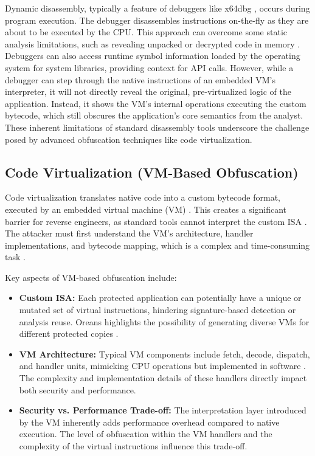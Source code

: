 Dynamic disassembly, typically a feature of debuggers like x64dbg \cite{Dun14}, occurs during program execution. The debugger disassembles instructions on-the-fly as they are about to be executed by the CPU. This approach can overcome some static analysis limitations, such as revealing unpacked or decrypted code in memory \cite{Sikorski2012}. Debuggers can also access runtime symbol information loaded by the operating system for system libraries, providing context for API calls. However, while a debugger can step through the native instructions of an embedded VM's interpreter, it will not directly reveal the original, pre-virtualized logic of the application. Instead, it shows the VM's internal operations executing the custom bytecode, which still obscures the application's core semantics from the analyst. These inherent limitations of standard disassembly tools underscore the challenge posed by advanced obfuscation techniques like code virtualization.

\subsection{Code Virtualization (VM-Based Obfuscation)}
Code virtualization translates native code into a custom bytecode format, executed by an embedded virtual machine (VM) \cite{Ore06, Zho24}. This creates a significant barrier for reverse engineers, as standard tools cannot interpret the custom ISA \cite{Salwan2018SymbolicDeobfuscation}. The attacker must first understand the VM's architecture, handler implementations, and bytecode mapping, which is a complex and time-consuming task \cite{Don20, Hac24}.

Key aspects of VM-based obfuscation include:
\begin{itemize}
    \item \textbf{Custom ISA:} Each protected application can potentially have a unique or mutated set of virtual instructions, hindering signature-based detection or analysis reuse. Oreans highlights the possibility of generating diverse VMs for different protected copies \cite{Ore06}.
    \item \textbf{VM Architecture:} Typical VM components include fetch, decode, dispatch, and handler units, mimicking CPU operations but implemented in software \cite{Salwan2018SymbolicDeobfuscation, Hac24}. The complexity and implementation details of these handlers directly impact both security and performance.
    \item \textbf{Security vs. Performance Trade-off:} The interpretation layer introduced by the VM inherently adds performance overhead compared to native execution. The level of obfuscation within the VM handlers and the complexity of the virtual instructions influence this trade-off.
\end{itemize}

